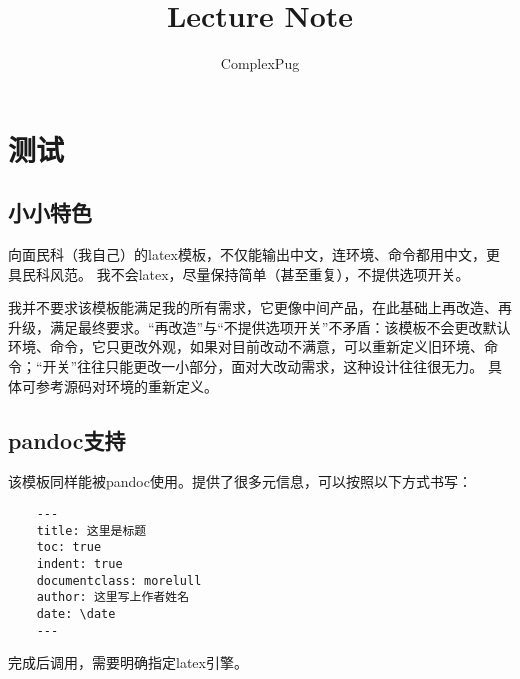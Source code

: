 \documentclass[12pt,A4paper,oneside]{ctexbook}
\begin{document}
\begin{titlepage}
    \title{Lecture Note}
    \author{ComplexPug}
    \maketitle
\end{titlepage}

\begin{titlepage}
	\tableofcontents
\end{titlepage}    

\chapter{测试}

\section{小小特色}

向面民科（我自己）的latex模板，不仅能输出中文，连环境、命令都用中文，更具民科风范。
我不会latex，尽量保持简单（甚至重复），不提供选项开关。

我并不要求该模板能满足我的所有需求，它更像中间产品，在此基础上再改造、再升级，满足最终要求。“再改造”与“不提供选项开关”不矛盾：该模板不会更改默认环境、命令，它只更改外观，如果对目前改动不满意，可以重新定义旧环境、命令；“开关”往往只能更改一小部分，面对大改动需求，这种设计往往很无力。
具体可参考源码对环境的重新定义。

\section{pandoc支持}

该模板同样能被pandoc使用。提供了很多元信息，可以按照以下方式书写：

\begin{lstlisting}
    ---
    title: 这里是标题
    toc: true
    indent: true
    documentclass: morelull
    author: 这里写上作者姓名
    date: \date
    ---
\end{lstlisting}

完成后调用，需要明确指定latex引擎。
\end{document}
